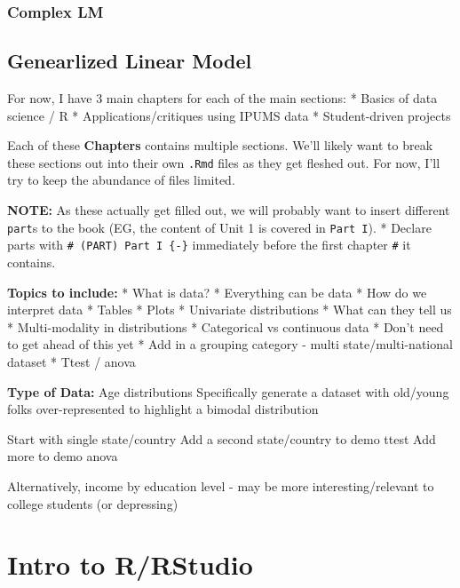\documentclass[
]{book}
\begin{document}
\hypertarget{complex-lm}{%
\subsubsection{Complex LM}\label{complex-lm}}

\hypertarget{genearlized-linear-model}{%
\subsection{Genearlized Linear Model}\label{genearlized-linear-model}}

For now, I have 3 main chapters for each of the main sections:
* Basics of data science / R
* Applications/critiques using IPUMS data
* Student-driven projects

Each of these \textbf{Chapters} contains multiple sections. We'll likely want to break these sections out into their own \texttt{.Rmd} files as they get fleshed out. For now, I'll try to keep the abundance of files limited.

\textbf{NOTE:} As these actually get filled out, we will probably want to insert different \texttt{part}s to the book (EG, the content of Unit 1 is covered in \texttt{Part\ I}).
* Declare parts with \texttt{\#\ (PART)\ Part\ I\ \{-\}} immediately before the first chapter \texttt{\#} it contains.

\textbf{Topics to include:}
* What is data?
* Everything can be data
* How do we interpret data
* Tables
* Plots
* Univariate distributions
* What can they tell us
* Multi-modality in distributions
* Categorical vs continuous data
* Don't need to get ahead of this yet
* Add in a grouping category - multi state/multi-national dataset
* Ttest / anova

\textbf{Type of Data:}
Age distributions
Specifically generate a dataset with old/young folks over-represented to highlight a bimodal distribution

Start with single state/country
Add a second state/country to demo ttest
Add more to demo anova

Alternatively, income by education level - may be more interesting/relevant to college students (or depressing)

\hypertarget{intro-to-rrstudio}{%
\section*{Intro to R/RStudio}\label{intro-to-rrstudio}}
\end{document}
